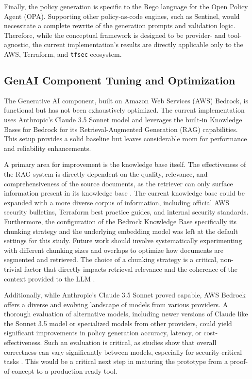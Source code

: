 Finally, the policy generation is specific to the Rego language for the Open Policy Agent (OPA). Supporting other policy-as-code engines, such as Sentinel, would necessitate a complete rewrite of the generation prompts and validation logic. Therefore, while the conceptual framework is designed to be provider- and tool-agnostic, the current implementation's results are directly applicable only to the AWS, Terraform, and \texttt{tfsec} ecosystem.

\subsection{GenAI Component Tuning and Optimization}
The Generative AI component, built on Amazon Web Services (AWS) Bedrock, is functional but has not been exhaustively optimized. The current implementation uses Anthropic's Claude 3.5 Sonnet model and leverages the built-in Knowledge Bases for Bedrock for its Retrieval-Augmented Generation (RAG) capabilities. This setup provides a solid baseline but leaves considerable room for performance and reliability enhancements.

A primary area for improvement is the knowledge base itself. The effectiveness of the RAG system is directly dependent on the quality, relevance, and comprehensiveness of the source documents, as the retriever can only surface information present in its knowledge base \cite{lewis_retrieval-augmented_2021}. The current knowledge base could be expanded with a more diverse corpus of information, including official AWS security bulletins, Terraform best practice guides, and internal security standards. Furthermore, the configuration of the Bedrock Knowledge Base specifically its chunking strategy and the underlying embedding model was left at the default settings for this study. Future work should involve systematically experimenting with different chunking sizes and overlaps to optimize how documents are segmented and retrieved. The choice of a chunking strategy is a critical, non-trivial factor that directly impacts retrieval relevance and the coherence of the context provided to the LLM \cite{gao_retrieval-augmented_2024}.

Additionally, while Anthropic's Claude 3.5 Sonnet proved capable, AWS Bedrock offers a diverse and evolving landscape of models from various providers. A thorough evaluation of alternative models, including newer versions of Claude like the Sonnet 3.5 model or specialized models from other providers, could yield significant improvements in policy generation accuracy, latency, or cost-effectiveness. Such an evaluation is critical, as studies show that overall correctness can vary significantly between models, especially for security-critical tasks \cite{pearce_deployability-centric_2025}. This would be a critical next step in maturing the prototype from a proof-of-concept to a production-ready tool.

